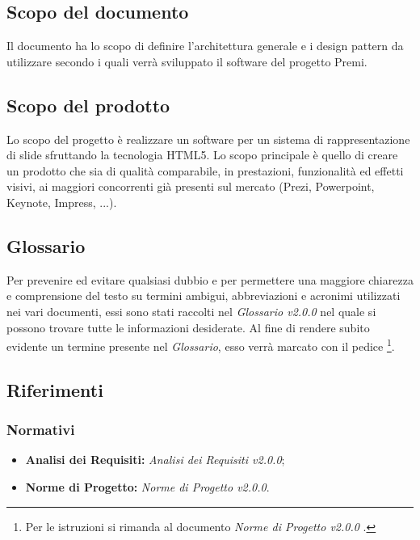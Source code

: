 \subsection{Scopo del documento}
	Il documento ha lo scopo di definire l'architettura generale e i \gls{design pattern} da utilizzare secondo i quali verrà sviluppato il software del progetto Premi.
	
\subsection{Scopo del prodotto}
Lo scopo del progetto è realizzare un software per un sistema di rappresentazione di \gls{slide} sfruttando la tecnologia  \gls{HTML5}. Lo scopo principale è quello di creare un prodotto che sia di qualità comparabile, in prestazioni, funzionalità ed effetti visivi, ai maggiori concorrenti già presenti sul mercato (Prezi, Powerpoint, Keynote, Impress, ...).

\subsection{Glossario}
Per prevenire ed evitare qualsiasi dubbio e per permettere una maggiore chiarezza e comprensione del testo su termini ambigui, abbreviazioni e acronimi utilizzati nei vari documenti, essi sono stati raccolti nel \textit{Glossario v2.0.0} nel quale si possono trovare tutte le informazioni desiderate.
Al fine di rendere subito evidente un termine presente nel \textit{Glossario}, esso verrà marcato con il pedice \G\footnote{Per le istruzioni si rimanda al documento \textit{Norme di Progetto v2.0.0} .}.

\subsection{Riferimenti}

\subsubsection{Normativi}
	\begin{itemize}
		\item \textbf{Analisi dei Requisiti:} \textit{Analisi dei Requisiti v2.0.0};
		\item \textbf{Norme di Progetto:} \textit{Norme di Progetto v2.0.0}.
	\end{itemize}
	
